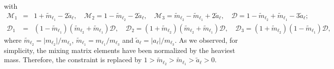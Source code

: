 \documentclass[aps,prd,groupaddress,floatfix,tighten,nofootinbib,showpacs,amsfonts,superscriptaddress]{revtex4-2}
\begin{document}
with 
\begin{eqnarray}
\mathcal{M}_{1}&=&1+\tilde{m}_{\ell_{1}}-2\tilde{a}_{\ell},\quad 
\mathcal{M}_{2}=1-\tilde{m}_{\ell_{2}}-2\tilde{a}_{\ell},\quad
\mathcal{M}_{3}=\tilde{m}_{\ell_{2}}-\tilde{m}_{\ell_{1}}+2\tilde{a}_{\ell}
,\quad
\mathcal{D}=1-\tilde{m}_{\ell_{2}}+\tilde{m}_{\ell_{1}}-3\tilde{a}_{\ell};\nonumber\\
\mathcal{D}_{1}&=&(1-\tilde{m}_{\ell_{1}})( \tilde{m}_{\ell_{2}}+\tilde{m}_{\ell_{1}})\mathcal{D},\quad
\mathcal{D}_{2}=(1+\tilde{m}_{\ell_{2}})( \tilde{m}_{\ell_{2}}+\tilde{m}_{\ell_{1}})\mathcal{D},\quad
\mathcal{D}_{3}=(1+ \tilde{m}_{\ell_{2}})(1-\tilde{m}_{\ell_{1}})\mathcal{D},
\label{eq8}
\end{eqnarray}
where $\tilde{m}_{\ell_{2}}=\vert m_{\ell_{2}}\vert /m_{\ell_{3}}$, $\tilde{m}_{\ell_{1}}=m_{\ell_{1}}/m_{\ell_{3}}$ and $\tilde{a}_{\ell}=\vert a_{\ell}\vert/ m_{\ell_{3}}$. As we observed, for simplicity, the mixing matrix elements have been normalized by the heaviest mass. Therefore, the constraint is replaced by $1>\tilde{m}_{\ell_{2}}>\tilde{m}_{\ell_{1}}>\tilde{a}_{\ell}>0$. 
\end{document}
